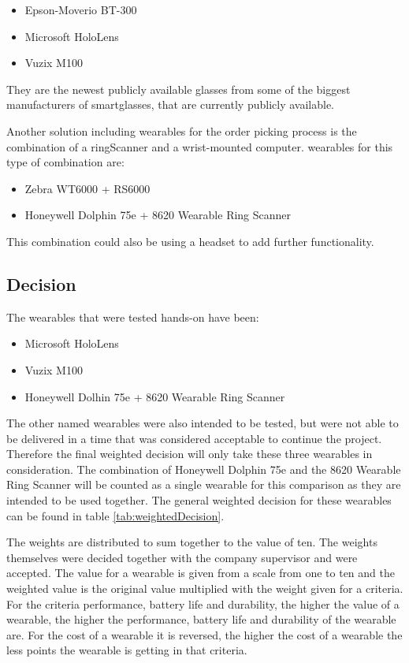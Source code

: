\begin{itemize}
	\item Epson-Moverio BT-300
	\item Microsoft HoloLens
	\item Vuzix M100
\end{itemize}

They are the newest publicly available glasses from some of the biggest manufacturers of \gls{smartglasses}, that are currently publicly available.

Another solution including wearables for the order picking process is the combination of a \gls{ringScanner} and a wrist-mounted computer. \Gls{wearable}s for this type of combination are:

\begin{itemize}
	\item Zebra WT6000 + RS6000
	\item Honeywell Dolphin 75e + 8620 Wearable Ring Scanner
\end{itemize}

This combination could also be using a headset to add further functionality.

\subsection{Decision}

The wearables that were tested hands-on have been:
\begin{itemize}
	\item Microsoft HoloLens
	\item Vuzix M100
	\item Honeywell Dolhin 75e + 8620 Wearable Ring Scanner
\end{itemize}

The other named wearables were also intended to be tested, but were not able to be delivered in a time that was considered acceptable to continue the project. Therefore the final weighted decision will only take these three wearables in consideration. The combination of Honeywell Dolphin 75e and the 8620 Wearable Ring Scanner will be counted as a single wearable for this comparison as they are intended to be used together. The general weighted decision for these wearables can be found in table \ref{tab:weightedDecision}. 

The weights are distributed to sum together to the value of ten. The weights themselves were decided together with the company supervisor and were accepted. The value for a wearable is given from a scale from one to ten and the weighted value is the original value multiplied with the weight given for a criteria. For the criteria performance, battery life and durability, the higher the value of a wearable, the higher the performance, battery life and durability of the wearable are. For the cost of a wearable it is reversed, the higher the cost of a wearable the less points the wearable is getting in that criteria.

